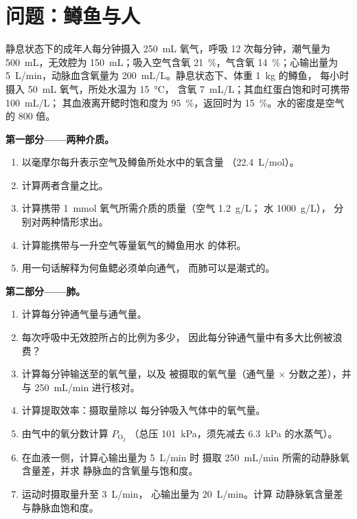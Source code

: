 \section{问题：鳟鱼与人}

\begin{problem}
\label{pb:b1:gas-exchange:1}
静息状态下的成年人每分钟摄入 \qty{250}{mL} 氧气，呼吸
\qty{12}{} 次每分钟，潮气量为 \qty{500}{mL}，无效腔为
\qty{150}{mL}；吸入空气含氧 \qty{21}{\%}，气含氧
\qty{14}{\%}；心输出量为 \qty{5}{L/min}，动脉血含氧量为
\qty{200}{mL/L}。静息状态下、体重 \qty{1}{kg} 的鳟鱼，
每小时摄入 \qty{50}{mL} 氧气，所处水温为 \qty{15}{\celsius}，
含氧 \qty{7}{mL/L}；其血红蛋白饱和时可携带 \qty{100}{mL/L}；
其血液离开鳃时饱和度为 \qty{95}{\%}，返回时为
\qty{15}{\%}。水的密度是空气的 \qty{800}{} 倍。

\medskip
\noindent\textbf{第一部分——两种介质。}
\begin{enumerate}
  \item 以毫摩尔每升表示空气及鳟鱼所处水中的氧含量
        （\qty{22.4}{L/mol}）。
  \item 计算两者含量之比。
  \item 计算携带 \qty{1}{mmol} 氧气所需介质的质量（空气 \qty{1.2}{g/L}；
        水 \qty{1000}{g/L}），
        分别对两种情形求出。
  \item 计算能携带与一升空气等量氧气的鳟鱼用水
        的体积。
  \item 用一句话解释为何鱼鳃必须单向通气，
        而肺可以是潮式的。
\end{enumerate}

\medskip
\noindent\textbf{第二部分——肺。}
\begin{enumerate}[resume]
  \item 计算每分钟通气量与通气量。
  \item 每次呼吸中无效腔所占的比例为多少，
        因此每分钟通气量中有多大比例被浪费？
  \item 计算每分钟输送至的氧气量，以及
        被摄取的氧气量（通气量 $\times$
        分数之差），并与 \qty{250}{mL/min} 进行核对。
  \item 计算提取效率：摄取量除以
        每分钟吸入气体中的氧气量。
  \item 由气中的氧分数计算 $P_{\mathrm{O_2}}$
        （总压 \qty{101}{kPa}，须先减去
        \qty{6.3}{kPa} 的水蒸气）。
  \item 在血液一侧，计算心输出量为 \qty{5}{L/min} 时
        摄取 \qty{250}{mL/min} 所需的动静脉氧含量差，并求
        静脉血的含氧量与饱和度。
  \item 运动时摄取量升至 \qty{3}{L/min}，
        心输出量为 \qty{20}{L/min}。计算
        动静脉氧含量差与静脉血饱和度。
\end{enumerate}


\end{problem}
